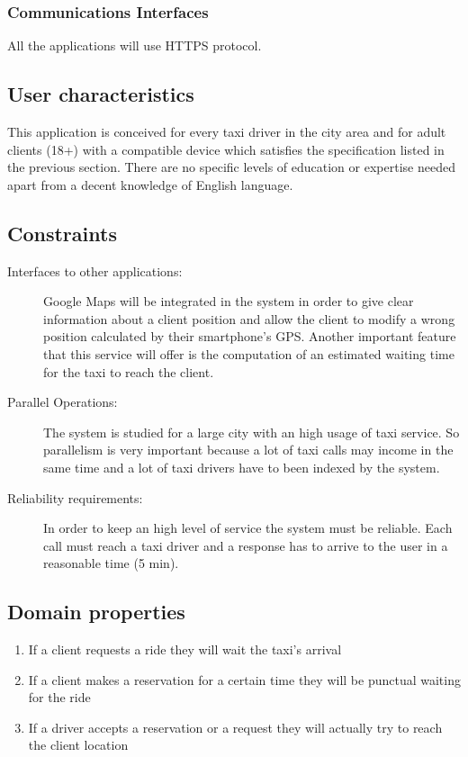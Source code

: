 \documentclass[a4paper]{article}
\begin{document}
\subsubsection{Communications Interfaces}
All the applications will use HTTPS protocol.

\subsection{User characteristics}
This application is conceived for every taxi driver in the city area and for adult clients (18+) with a compatible device which satisfies the specification listed in the previous section. There are no specific levels of education or expertise needed apart from a decent knowledge of English language.

\subsection{Constraints}
\begin{description}
\item[Interfaces to other applications:] Google Maps will be integrated in the system in order to give clear information about a client position and allow the client to modify a wrong position calculated by their smartphone's GPS. Another important feature that this service will offer is the computation of an estimated waiting time for the taxi to reach the client.
\item[Parallel Operations:] The system is studied for a large city with an high usage of taxi service. So parallelism is very important because a lot of taxi calls may income in the same time and a lot of taxi drivers have to been indexed by the system.
\item[Reliability requirements:] In order to keep an high level of service the system must be reliable. Each call must reach a taxi driver and a response has to arrive to the user in a reasonable time (5 min).
\end{description}

\subsection{Domain properties}
\begin{enumerate}[label=\bfseries D\arabic*:]
\item If a client requests a ride they will wait the taxi's arrival
\item If a client makes a reservation for a certain time they will be punctual waiting for the ride
\item If a driver accepts a reservation or a request they will actually try to reach the client location

\end{enumerate}
\end{document}
